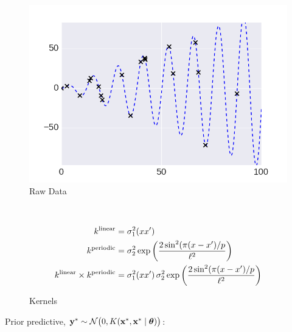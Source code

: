  \centering

     \begin{subfigure}[b]{0.3\textwidth}
        \includegraphics[width=\textwidth]{figs/composition/composition_demo_raw_data.png}
        \caption{Raw Data}
    \end{subfigure}
    ~ %
    \begin{subfigure}[b]{0.55\textwidth}
\small
     \begin{align*}
        k^\text{linear} &=   \sigma_1^2(x x^\prime)\\
    k^\text{periodic} &=  \sigma_2^2 \exp \bigg( \frac{2 \sin^2 ( \pi (x -
x^\prime)/p}{\ell^2} \bigg)\\ 
    k^\text{linear} \times k^\text{periodic} &=  \sigma_1^2(x x^\prime)\, \sigma_2^2 \exp \bigg( \frac{2 \sin^2 ( \pi (x - x^\prime)/p}{\ell^2} \bigg) 
    \end{align*}\vspace{0mm} 
        \caption{Kernels}
    \end{subfigure}\vspace{4mm} 




Prior predictive, $\mathbf{y}^* \sim \mathcal{N}\big(0,K(\mathbf{x}^*,\mathbf{x}^* \mid \bm{\theta})\big)$:


